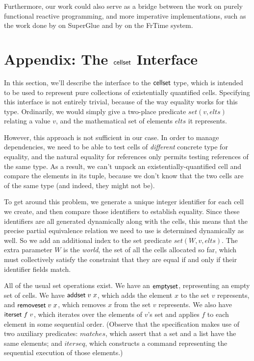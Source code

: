 Furthermore, our work could also serve as a bridge between the work on
purely functional reactive programming, and more imperative
implementations, such as the work done by \citet{superglue} on
SuperGlue and by \citet{frtime} on the FrTime system.


\section{Appendix: The $\mathsf{cellset}$ Interface}

In this section, we'll describe the interface to the $\mathsf{cellset}$ type,
which is intended to be used to represent pure collections of
existentially quantified cells. Specifying this interface is not
entirely trivial, because of the way equality works for this
type. Ordinarily, we would simply give a two-place predicate $set(v,
elts)$ relating a value $v$, and the mathematical set of elements
$elts$ it represents.

However, this approach is not sufficient in our case. In order to
manage dependencies, we need to be able to test cells of
\emph{different} concrete type for equality, and the natural equality
for references only permits testing references of the same type. As a
result, we can't unpack an existentially-quantified cell and compare
the elements in its tuple, because we don't know that the two cells
are of the same type (and indeed, they might not be). 

To get around this problem, we generate a unique integer identifier
for each cell we create, and then compare those identifiers to
establish equality. Since these identifiers are all generated
dynamically along with the cells, this means that the precise partial
equivalence relation we need to use is determined dynamically as
well. So we add an additional index to the set predicate $set(W, v,
elts)$. The extra parameter $W$ is the \emph{world}, the set of all
the cells allocated so far, which must collectively satisfy the
constraint that they are equal if and only if their identifier fields
match. 

All of the usual set operations exist. We have an $\mathsf{emptyset}$,
representing an empty set of cells. We have $\mathsf{addset}\;v\;x$,
which adds the element $x$ to the set $v$ represents, and
$\mathsf{removeset}\;v\;x$, which removes $x$ from the set $v$
represents. We also have $\mathsf{iterset}\;f\;v$, which iterates over
the elements of $v$'s set and applies $f$ to each element in some
sequential order. (Observe that the specification makes use of two 
auxiliary predicates: $matches$, which assert that a
set and a list have the same elements; and $iterseq$, which constructs
a command representing the sequential execution of those elements.) 

